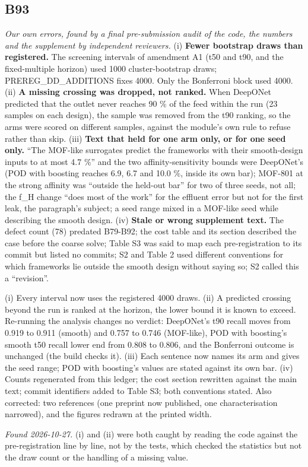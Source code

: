\documentclass[10pt]{article}
\begin{document}
\subsection*{B93}\label{led:B93}
\begin{description}[leftmargin=0pt,itemsep=1pt]
\item[Defect.] \emph{Our own errors, found by a final pre-submission audit of the code, the numbers and the supplement by independent reviewers.} (i) \textbf{Fewer bootstrap draws than registered.} The screening intervals of amendment A1 (t50 and t90, and the fixed-multiple horizon) used 1000 cluster-bootstrap draws; PREREG\_DD\_ADDITIONS fixes 4000. Only the Bonferroni block used 4000. (ii) \textbf{A missing crossing was dropped, not ranked.} When DeepONet predicted that the outlet never reaches 90 \% of the feed within the run (23 samples on each design), the sample was removed from the t90 ranking, so the arms were scored on different samples, against the module's own rule to refuse rather than skip. (iii) \textbf{Text that held for one arm only, or for one seed only.} ``The MOF-like surrogates predict the frameworks with their smooth-design inputs to at most 4.7 \%'' and the two affinity-sensitivity bounds were DeepONet's (POD with boosting reaches 6.9, 6.7 and 10.0 \%, inside its own bar); MOF-801 at the strong affinity was ``outside the held-out bar'' for two of three seeds, not all; the f\_H change ``does most of the work'' for the effluent error but not for the first leak, the paragraph's subject; a seed range mixed in a MOF-like seed while describing the smooth design. (iv) \textbf{Stale or wrong supplement text.} The defect count (78) predated B79-B92; the cost table and its section described the case before the coarse solve; Table S3 was said to map each pre-registration to its commit but listed no commits; S2 and Table 2 used different conventions for which frameworks lie outside the smooth design without saying so; S2 called this a ``revision''.
\item[Resolution.] (i) Every interval now uses the registered 4000 draws. (ii) A predicted crossing beyond the run is ranked at the horizon, the lower bound it is known to exceed. Re-running the analysis changes no verdict: DeepONet's t90 recall moves from 0.919 to 0.911 (smooth) and 0.757 to 0.746 (MOF-like), POD with boosting's smooth t50 recall lower end from 0.808 to 0.806, and the Bonferroni outcome is unchanged (the build checks it). (iii) Each sentence now names its arm and gives the seed range; POD with boosting's values are stated against its own bar. (iv) Counts regenerated from this ledger; the cost section rewritten against the main text; commit identifiers added to Table S3; both conventions stated. Also corrected: two references (one preprint now published, one characterisation narrowed), and the figures redrawn at the printed width.
\item[Note.] \emph{Found 2026-10-27.} (i) and (ii) were both caught by reading the code against the pre-registration line by line, not by the tests, which checked the statistics but not the draw count or the handling of a missing value.
\end{description}
\end{document}
